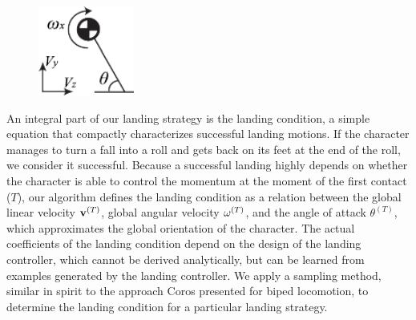 \begin{figure}
  \begin{center}
    \includegraphics[width=0.28\textwidth]{images/COM}
  \end{center}
\end{figure}
An integral part of our landing strategy is the landing condition, a
simple equation that compactly characterizes successful landing
motions.
 If the character manages to turn a fall
into a roll and gets back on its feet at the end of the roll, we
consider it successful.  Because a successful landing highly depends
on whether the character is able to control the momentum
at the moment of the first contact ($T$),
our algorithm defines the landing condition as a relation between the
global linear velocity $\mathbf{v}^{(T)}$, global angular velocity
$\mathbf{\omega}^{(T)}$, and the angle of attack $\theta^{(T)}$, which
approximates the global orientation of the character. The actual
coefficients of the landing condition depend on the design of the
landing controller, which cannot be derived analytically, but can be
learned from examples generated by the landing controller. We apply a
sampling method, similar in spirit to the approach Coros \etal
\cite{Coros:2009:RTC} presented for biped locomotion, to determine the
landing condition for a particular landing strategy.  

